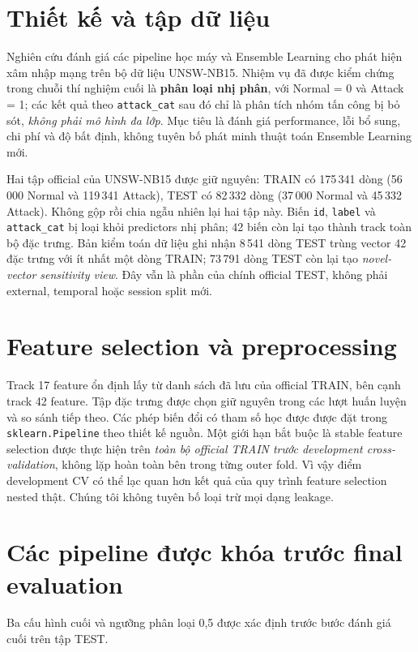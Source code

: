 


\section{Thiết kế và tập dữ liệu}
Nghiên cứu đánh giá các pipeline học máy và Ensemble Learning cho phát hiện xâm nhập mạng trên bộ dữ liệu UNSW-NB15\cite{moustafa2015unsw}. Nhiệm vụ đã được kiểm chứng trong chuỗi thí nghiệm cuối là \textbf{phân loại nhị phân}, với Normal = 0 và Attack = 1; các kết quả theo \texttt{attack\_cat} sau đó chỉ là phân tích nhóm tấn công bị bỏ sót, \emph{không phải mô hình đa lớp}. Mục tiêu là đánh giá performance, lỗi bổ sung, chi phí và độ bất định, không tuyên bố phát minh thuật toán Ensemble Learning mới.

Hai tập official của UNSW-NB15 được giữ nguyên: TRAIN có 175\,341 dòng (56\,000 Normal và 119\,341 Attack), TEST có 82\,332 dòng (37\,000 Normal và 45\,332 Attack). Không gộp rồi chia ngẫu nhiên lại hai tập này. Biến \texttt{id}, \texttt{label} và \texttt{attack\_cat} bị loại khỏi predictors nhị phân; 42 biến còn lại tạo thành track toàn bộ đặc trưng. Bản kiểm toán dữ liệu ghi nhận 8\,541 dòng TEST trùng vector 42 đặc trưng với ít nhất một dòng TRAIN; 73\,791 dòng TEST còn lại tạo \emph{novel-vector sensitivity view}. Đây vẫn là phần của chính official TEST, không phải external, temporal hoặc session split mới.

\section{Feature selection và preprocessing}
Track 17 feature ổn định lấy từ danh sách đã lưu của official TRAIN, bên cạnh track 42 feature. Tập đặc trưng được chọn giữ nguyên trong các lượt huấn luyện và so sánh tiếp theo. Các phép biến đổi có tham số học được được đặt trong \texttt{sklearn.Pipeline} theo thiết kế nguồn. Một giới hạn bắt buộc là stable feature selection được thực hiện trên \emph{toàn bộ official TRAIN trước development cross-validation}, không lặp hoàn toàn bên trong từng outer fold. Vì vậy điểm development CV có thể lạc quan hơn kết quả của quy trình feature selection nested thật. Chúng tôi không tuyên bố loại trừ mọi dạng leakage.

\section{Các pipeline được khóa trước final evaluation}
Ba cấu hình cuối và ngưỡng phân loại 0,5 được xác định trước bước đánh giá cuối trên tập TEST.

